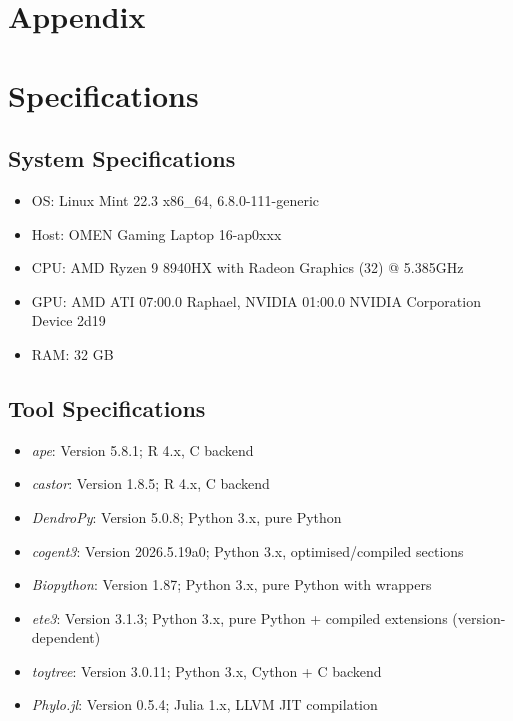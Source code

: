 \documentclass[11pt, a4paper]{article}
\newcommand{\ape}{\textit{ape}}
\newcommand{\dendropy}{\textit{DendroPy}}
\newcommand{\cogent}{\textit{cogent3}}
\newcommand{\biopython}{\textit{Biopython}}
\newcommand{\ete}{\textit{ete3}}
\newcommand{\toytree}{\textit{toytree}}
\newcommand{\phylo}{\textit{Phylo.jl}}
\newcommand{\castor}{\textit{castor}}
\begin{document}
\newpage

\section{Appendix}

\appendix

\section{Specifications}

\subsection{System Specifications}
\begin{itemize}
    \item OS: Linux Mint 22.3 x86\_64, 6.8.0-111-generic 
    \item Host: OMEN Gaming Laptop 16-ap0xxx 
    \item CPU: AMD Ryzen 9 8940HX with Radeon Graphics (32) @ 5.385GHz 
    \item GPU: AMD ATI 07:00.0 Raphael, NVIDIA 01:00.0 NVIDIA Corporation Device 2d19 
    \item RAM: 32 GB
\end{itemize}

\subsection{Tool Specifications}

\begin{itemize}
    \item \ape: Version 5.8.1; R 4.x, C backend
    \item \castor: Version 1.8.5; R 4.x, C backend
    \item \dendropy: Version 5.0.8; Python 3.x, pure Python
    \item \cogent: Version 2026.5.19a0; Python 3.x, optimised/compiled sections
    \item \biopython: Version 1.87; Python 3.x, pure Python with wrappers
    \item \ete: Version 3.1.3; Python 3.x, pure Python + compiled extensions (version-dependent)
    \item \toytree: Version 3.0.11; Python 3.x, Cython + C backend
    \item \phylo: Version 0.5.4; Julia 1.x, LLVM JIT compilation
\end{itemize}
\end{document}
